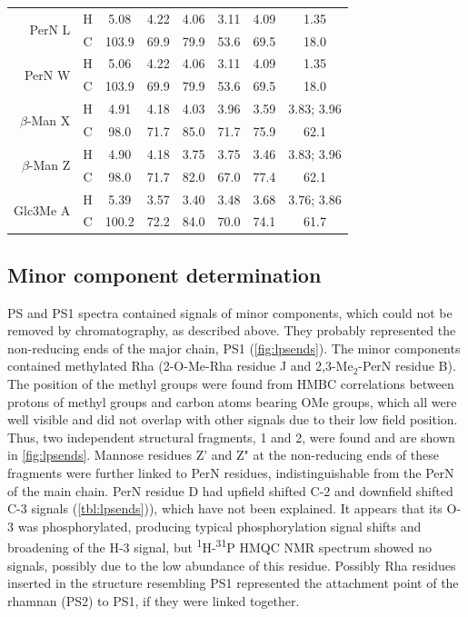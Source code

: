 \begin{table}[hp]
\begin{tabular}{@{}rccccccc@{}}
    \multirow{2}{*}{PerN L}        & H & 5.08  & 4.22 & 4.06 & 3.11 & 4.09 & 1.35 \\
 & C & 103.9 & 69.9 & 79.9 & 53.6 & 69.5 & 18.0 \\
    \multirow{2}{*}{PerN W}        & H & 5.06  & 4.22 & 4.06 & 3.11 & 4.09 & 1.35 \\
 & C & 103.9 & 69.9 & 79.9 & 53.6 & 69.5 & 18.0 \\
    \multirow{2}{*}{$\beta$-Man X} & H & 4.91  & 4.18 & 4.03 & 3.96 & 3.59 & 3.83; 3.96 \\
 & C & 98.0  & 71.7 & 85.0 & 71.7 & 75.9 & 62.1 \\
    \multirow{2}{*}{$\beta$-Man Z} & H & 4.90  & 4.18 & 3.75 & 3.75 & 3.46 & 3.83; 3.96 \\
 & C & 98.0  & 71.7 & 82.0 & 67.0 & 77.4 & 62.1 \\
    \multirow{2}{*}{Glc3Me A}      & H & 5.39  & 3.57 & 3.40 & 3.48 & 3.68 & 3.76; 3.86 \\
 & C & 100.2 & 72.2 & 84.0 & 70.0 & 74.1 & 61.7 \\ \bottomrule
  \end{tabular}
\end{table}
  
\subsection{Minor component determination} %
\label{sub:minor_component_determination}

\ac{PS} and \ac{PS}1 spectra contained signals of minor components, which could not be removed by
chromatography, as described above. They probably represented the non-reducing ends of the major
chain, \ac{PS}1 (\cref{fig:lpsends}). The minor components contained methylated Rha (2-O-Me-Rha
residue J and 2,3-Me$_2$-PerN residue B). The position of the methyl groups were found from
\ac{HMBC} correlations between protons of methyl groups and carbon atoms bearing OMe groups, which
all were well visible and did not overlap with other signals due to their low field
position. Thus, two independent structural fragments, 1 and 2, were found and are shown in
\cref{fig:lpsends}. Mannose residues Z' and Z" at the non-reducing ends of these fragments were
further linked to PerN residues, indistinguishable from the PerN of the main chain. PerN residue D
had upfield shifted C-2 and downfield shifted C-3 signals (\cref{tbl:lpsends})), which have not
been explained. It appears that its O-3 was phosphorylated, producing typical phosphorylation
signal shifts and broadening of the H-3 signal, but \textsuperscript{1}H-\textsuperscript{31}P
\ac{HMQC} \ac{NMR} spectrum showed no signals, possibly due to the low abundance of this
residue. Possibly Rha residues inserted in the structure resembling \ac{PS}1 represented the
attachment point of the rhamnan (\ac{PS}2) to \ac{PS}1, if they were linked together.

